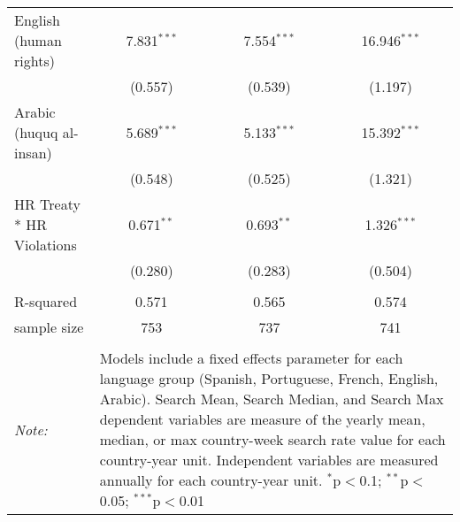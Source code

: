\begin{table}[!htbp]
\begin{tabular}{@{\extracolsep{5pt}}lccc}
  English (human rights) & 7.831$^{***}$ & 7.554$^{***}$ & 16.946$^{***}$ \\ 
  & (0.557) & (0.539) & (1.197) \\ 
  Arabic (huquq al-insan) & 5.689$^{***}$ & 5.133$^{***}$ & 15.392$^{***}$ \\ 
  & (0.548) & (0.525) & (1.321) \\ 
  HR Treaty * HR Violations & 0.671$^{**}$ & 0.693$^{**}$ & 1.326$^{***}$ \\ 
  & (0.280) & (0.283) & (0.504) \\ 
 \hline \\[-1.8ex] 
R-squared  & 0.571 & 0.565 & 0.574 \\ 
sample size  & 753 & 737 & 741 \\ 
\hline 
\hline \\[-1.8ex] 
\textit{Note:}  & \multicolumn{3}{l}{\parbox[t]{8cm}{Models include a fixed effects parameter for each language group (Spanish, Portuguese, French, English, Arabic). Search Mean, Search Median, and Search Max dependent variables are measure of the yearly mean, median, or max country-week search rate value for each country-year unit. Independent variables are measured annually for each country-year unit. $^{*}$p$<$0.1; $^{**}$p$<$0.05; $^{***}$p$<$0.01}} \\ 
\end{tabular} 
\end{table} 
